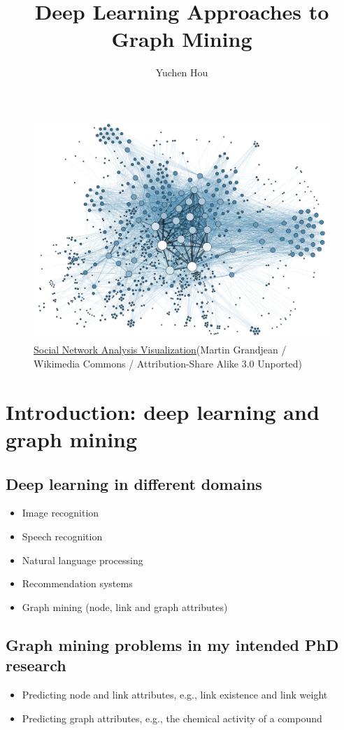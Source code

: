 \documentclass{article}
\title{Deep Learning Approaches to Graph Mining}
\author{Yuchen Hou}
\begin{document}
\begin{landscape}
\maketitle
\begin{figure}[H]
	\centering
	\includegraphics[width=0.6\linewidth]{Social_Network_Analysis_Visualization}
	\caption{ \href{https://commons.wikimedia.org/wiki/File:Social_Network_Analysis_Visualization.png}{Social Network Analysis Visualization}(Martin Grandjean / Wikimedia Commons / Attribution-Share Alike 3.0 Unported)}
	\label{fig:Social_Network_Analysis_Visualization}
\end{figure}

\pagebreak
\section{Introduction: deep learning and graph mining}

\subsection{Deep learning in different domains}
\begin{itemize}
	\item Image recognition
	\item Speech recognition
	\item Natural language processing
	\item Recommendation systems
	\item Graph mining (node, link and graph attributes)
\end{itemize}

\subsection{Graph mining problems in my intended PhD research}
\begin{itemize}
	\item Predicting node and link attributes, e.g., link existence and	link weight
	\item Predicting graph attributes, e.g., the chemical activity of a compound
\end{itemize}


\end{landscape}
\end{document}

